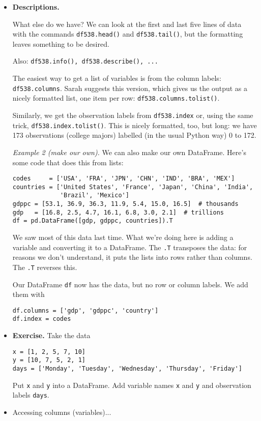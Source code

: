 \documentclass[11pt]{article}
\begin{document}
\begin{itemize}
\item {\bf Descriptions.}

What else do we have?
We can look at the first and last five lines of data with the
commands {\tt df538.head()} and {\tt df538.tail()},
but the formatting leaves something to be desired.

Also:  {\tt df538.info(), df538.describe(), ...}

The easiest way to get a list of variables is from the column labels:
{\tt df538.columns}.
Sarah suggests this version, which gives us the output as a nicely formatted list,
one item per row:
{\tt df538.columns.tolist()}.

Similarly, we get the observation labels from
{\tt df538.index} or, using the same trick, {\tt df538.index.tolist()}.
This is nicely formatted, too, but long:  we have 173 observations (college majors)
labelled (in the usual Python way) 0 to 172.


{\it Example 2 (make our own).\/}
We can also make our own DataFrame.  Here's some code that does this from lists:
\begin{verbatim}
codes     = ['USA', 'FRA', 'JPN', 'CHN', 'IND', 'BRA', 'MEX']
countries = ['United States', 'France', 'Japan', 'China', 'India',
             'Brazil', 'Mexico']
gdppc = [53.1, 36.9, 36.3, 11.9, 5.4, 15.0, 16.5]  # thousands
gdp   = [16.8, 2.5, 4.7, 16.1, 6.8, 3.0, 2.1]  # trillions
df = pd.DataFrame([gdp, gdppc, countries]).T
\end{verbatim}
We saw most of this data last time.
What we're doing here is adding a variable and converting it to a DataFrame.
The {\tt .T} transposes the data:  for reasons we don't understand,
it puts the lists into rows rather than columns.
The {\tt .T} reverses this.

Our DataFrame {\tt df} now has the data, but no row or column labels.
We add them with
\begin{verbatim}
df.columns = ['gdp', 'gdppc', 'country']
df.index = codes
\end{verbatim}

\item {\bf Exercise.}
Take the data
\begin{verbatim}
x = [1, 2, 5, 7, 10]
y = [10, 7, 5, 2, 1]
days = ['Monday', 'Tuesday', 'Wednesday', 'Thursday', 'Friday']
\end{verbatim}
Put {\tt x} and {\tt y} into a DataFrame.
Add variable names {\tt x} and {\tt y} and observation labels {\tt days}.

\item Accessing columns (variables)...


\end{itemize}
\end{document}
